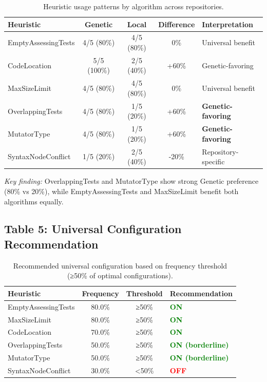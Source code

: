 \documentclass{article}
\begin{document}
\begin{table}[h]
\centering
\caption{Heuristic usage patterns by algorithm across repositories.}
\label{tab:patterns}
\begin{tabular}{@{}lcccl@{}}
\toprule
\textbf{Heuristic} & \textbf{Genetic} & \textbf{Local} & \textbf{Difference} & \textbf{Interpretation} \\
\midrule
EmptyAssessingTests  & 4/5 (80\%) & 4/5 (80\%)  & 0\%   & Universal benefit \\
CodeLocation         & 5/5 (100\%) & 2/5 (40\%)  & +60\% & Genetic-favoring \\
MaxSizeLimit         & 4/5 (80\%)  & 4/5 (80\%)  & 0\%   & Universal benefit \\
OverlappingTests     & 4/5 (80\%)  & 1/5 (20\%)  & +60\% & \textbf{Genetic-favoring} \\
MutatorType          & 4/5 (80\%)  & 1/5 (20\%)  & +60\% & \textbf{Genetic-favoring} \\
SyntaxNodeConflict   & 1/5 (20\%)  & 2/5 (40\%)  & -20\% & Repository-specific \\
\bottomrule
\end{tabular}
\end{table}

\textit{Key finding:} OverlappingTests and MutatorType show strong Genetic preference (80\% vs 20\%), while EmptyAssessingTests and MaxSizeLimit benefit both algorithms equally.


\subsection*{Table 5: Universal Configuration Recommendation}

\begin{table}[h]
\centering
\caption{Recommended universal configuration based on frequency threshold (≥50\% of optimal configurations).}
\label{tab:universal}
\begin{tabular}{@{}lccl@{}}
\toprule
\textbf{Heuristic} & \textbf{Frequency} & \textbf{Threshold} & \textbf{Recommendation} \\
\midrule
EmptyAssessingTests  & 80.0\% & ≥50\% & \textcolor{green}{\textbf{ON}} \\
MaxSizeLimit         & 80.0\% & ≥50\% & \textcolor{green}{\textbf{ON}} \\
CodeLocation         & 70.0\% & ≥50\% & \textcolor{green}{\textbf{ON}} \\
OverlappingTests     & 50.0\% & ≥50\% & \textcolor{green}{\textbf{ON (borderline)}} \\
MutatorType          & 50.0\% & ≥50\% & \textcolor{green}{\textbf{ON (borderline)}} \\
\midrule
SyntaxNodeConflict   & 30.0\% & <50\% & \textcolor{red}{\textbf{OFF}} \\
\bottomrule
\end{tabular}
\end{table}
\end{document}
